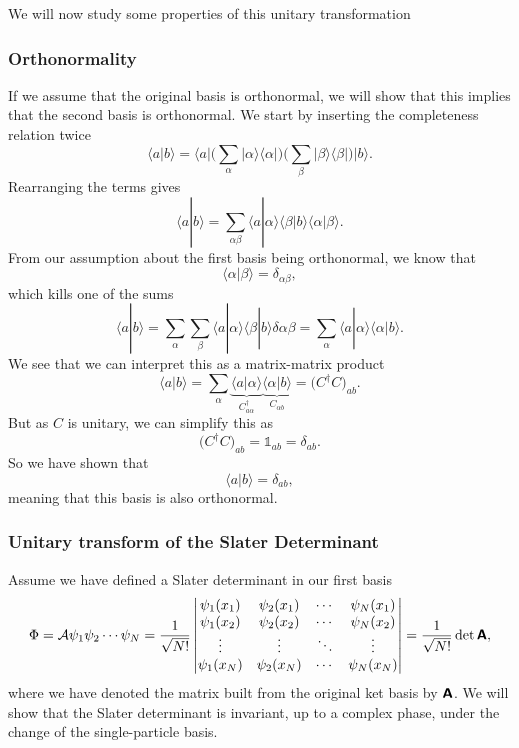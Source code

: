 \documentclass[a4paper, 11pt, notitlepage, english]{article}
\newcommand{\bra}[1]{\langle #1|}
\newcommand{\ket}[1]{|#1 \rangle}
\newcommand{\braket}[2]{\langle #1 | #2 \rangle}
\newcommand{\ketbra}[2]{\ket{#1}\bra{#2}}
\newcommand{\mat}[1]{\textsf{\textbf{#1}}}
\begin{document}
We will now study some properties of this unitary transformation

\subsubsection*{Orthonormality}
If we assume that the original basis is orthonormal, we will show that this implies that the second basis is orthonormal. We start by inserting the completeness relation twice
$$\braket{a}{b} = \bra{a} \bigg(\sum_\alpha \ketbra{\alpha}{\alpha} \bigg)\bigg(\sum_\beta \ketbra{\beta}{\beta}  \bigg) \ket{b}.$$
Rearranging the terms gives
$$\braket{a}{b} = \sum_{\alpha\beta} \braket{a}{\alpha} \braket{\beta}{b} \braket{\alpha}{\beta}.$$
From our assumption about the first basis being orthonormal, we know that
$$\braket{\alpha}{\beta} = \delta_{\alpha\beta},$$
which kills one of the sums
$$\braket{a}{b} = \sum_\alpha \sum_\beta \braket{a}{\alpha} \braket{\beta}{b} \delta{\alpha\beta} = \sum_\alpha  \braket{a}{\alpha} \braket{\alpha}{b}.$$
We see that we can interpret this as a matrix-matrix product
$$\braket{a}{b} = \sum_\alpha \underbrace{\braket{a}{\alpha}}_{C^\dag_{a\alpha}} \underbrace{\braket{\alpha}{b}}_{C_{\alpha b}} = \bigg(C^\dag C\bigg)_{ab}.$$
But as $C$ is unitary, we can simplify this as
$$\bigg(C^\dag C\bigg)_{ab} = \mathbb{1}_{ab} = \delta_{ab}.$$
So we have shown that
$$\braket{a}{b} = \delta_{ab},$$
meaning that this basis is also orthonormal.

\subsubsection*{Unitary transform of the Slater Determinant}
Assume we have defined a Slater determinant in our first basis
$$\Phi = \mathcal{A}\psi_1\psi_2\cdots\psi_N = \frac{1}{\sqrt{N!}}
\begin{vmatrix}
\psi_1(x_1) & \psi_2 (x_1) & \cdots & \psi_N(x_1) \\
\psi_1(x_2) & \psi_2 (x_2) & \cdots & \psi_N(x_2) \\
\vdots & \vdots & \ddots & \vdots \\
\psi_1(x_N) & \psi_2 (x_N) & \cdots & \psi_N(x_N) \\
\end{vmatrix} = \frac{1}{\sqrt{N!}} \det \mat A, $$
where we have denoted the matrix built from the original ket basis by $\mat A$. We will show that the Slater determinant is invariant, up to a complex phase, under the change of the single-particle basis.
\end{document}
